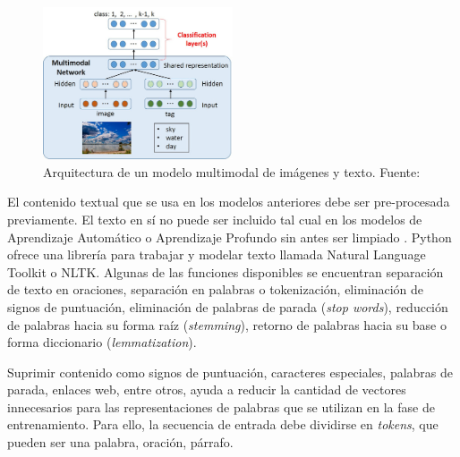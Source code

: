 \begin{itemize}
	\begin{figure}[!ht]
		\begin{center}
			\includegraphics[width=0.50\textwidth]{2/figures/multimodal_network.jpg}
			\caption[Arquitectura de un modelo multimodal de imágenes y texto]{Arquitectura de un modelo multimodal de imágenes y texto. Fuente: \cite{tec_nishida2015multimodal}}
			\label{2:fig46}
		\end{center}
	\end{figure}
	
\end{itemize}

El contenido textual que se usa en los modelos anteriores debe ser pre-procesada previamente. El texto en sí no puede ser incluido tal cual en los modelos de Aprendizaje Automático o Aprendizaje Profundo sin antes ser limpiado \parencite{bk_brownlee2017deeplearning_nlp}. Python ofrece una librería para trabajar y modelar texto llamada Natural Language Toolkit o NLTK. Algunas de las funciones disponibles se encuentran separación de texto en oraciones, separación en palabras o tokenización, eliminación de signos de puntuación, eliminación de palabras de parada (\textit{stop words}), reducción de palabras hacia su forma raíz (\textit{stemming}), retorno de palabras hacia su base o forma diccionario (\textit{lemmatization}).

Suprimir contenido como signos de puntuación, caracteres especiales, palabras de parada, enlaces web, entre otros, ayuda a reducir la cantidad de vectores innecesarios para las representaciones de palabras que se utilizan en la fase de entrenamiento. Para ello, la secuencia de entrada debe dividirse en \textit{tokens}, que pueden ser una palabra, oración, párrafo.

